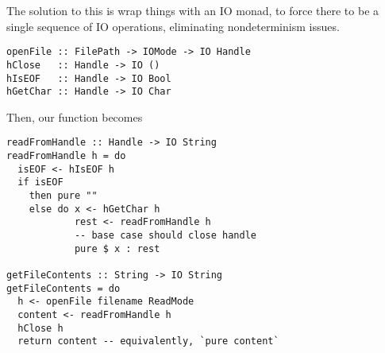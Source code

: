 \documentclass[class=scrartcl]{standalone}
\begin{document}
The solution to this is wrap things with an IO monad,
to force there to be a single sequence of IO operations,
eliminating nondeterminism issues.
\begin{verbatim}
openFile :: FilePath -> IOMode -> IO Handle
hClose   :: Handle -> IO ()
hIsEOF   :: Handle -> IO Bool
hGetChar :: Handle -> IO Char
\end{verbatim}
Then, our function becomes
\begin{verbatim}
readFromHandle :: Handle -> IO String
readFromHandle h = do
  isEOF <- hIsEOF h
  if isEOF
    then pure ""
    else do x <- hGetChar h
            rest <- readFromHandle h
            -- base case should close handle
            pure $ x : rest
  
getFileContents :: String -> IO String
getFileContents = do
  h <- openFile filename ReadMode
  content <- readFromHandle h
  hClose h
  return content -- equivalently, `pure content`
\end{verbatim}
\end{document}
